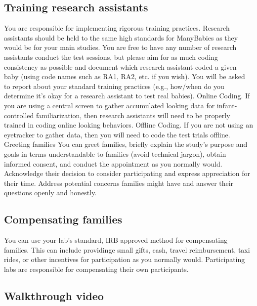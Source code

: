 \documentclass[
]{book}
\begin{document}
\hypertarget{training-research-assistants}{%
\subsection{Training research assistants}\label{training-research-assistants}}

You are responsible for implementing rigorous training practices. Research assistants should be held to the same high standards for ManyBabies as they would be for your main studies. You are free to have any number of research assistants conduct the test sessions, but please aim for as much coding consistency as possible and document which research assistant coded a given baby (using code names such as RA1, RA2, etc. if you wish). You will be asked to report about your standard training practices (e.g., how/when do you determine it's okay for a research assistant to test real babies).
Online Coding. If you are using a central screen to gather accumulated looking data for infant-controlled familiarization, then research assistants will need to be properly trained in coding online looking behaviors.
Offline Coding. If you are not using an eyetracker to gather data, then you will need to code the test trials offline.\\
Greeting families
You can greet families, briefly explain the study's purpose and goals in terms understandable to families (avoid technical jargon), obtain informed consent, and conduct the appointment as you normally would. Acknowledge their decision to consider participating and express appreciation for their time. Address potential concerns families might have and answer their questions openly and honestly.

\hypertarget{compensating-families}{%
\subsection{Compensating families}\label{compensating-families}}

You can use your lab's standard, IRB-approved method for compensating families. This can include providinge small gifts, cash, travel reimbursement, taxi rides, or other incentives for participation as you normally would. Participating labs are responsible for compensating their own participants.

\hypertarget{walkthrough-video}{%
\subsection{Walkthrough video}\label{walkthrough-video}}
\end{document}
